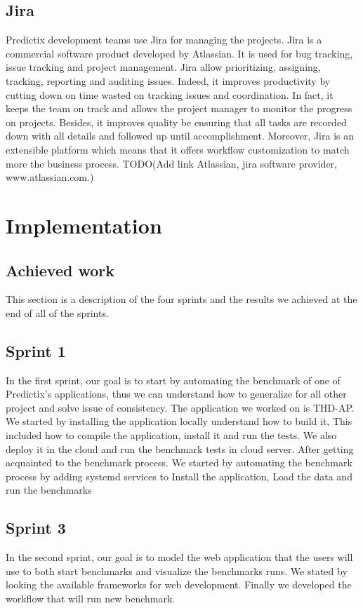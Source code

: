 \subsection{Jira}
Predictix development teams use Jira for managing the projects. Jira is a
commercial software product developed by Atlassian. It is used for bug tracking,
issue tracking and project management. Jira allow prioritizing, assigning,
tracking, reporting and auditing issues. Indeed, it improves productivity by
cutting down on time wasted on tracking issues and coordination. In fact, it
keeps the team on track and allows the project manager to monitor the progress
on projects. Besides, it improves quality be ensuring that all tasks are
recorded down with all details and followed up until accomplishment. Moreover,
Jira is an extensible platform which means that it offers workflow customization
to match more the business process. TODO(Add link Atlassian, jira software
provider, www.atlassian.com.)


\section{Implementation}
\subsection{Achieved work}
This section is a description of the four sprints and the results we achieved at
the end of all of the sprints.
\subsection{Sprint 1}
In the first sprint, our goal is to start by automating the benchmark of one of
Predictix's applications, thus we can understand how to generalize for all other
project and solve issue of consistency. The application we worked on is THD-AP.
We started by installing the application locally understand how to build it,
This included how to compile the application, install it and run the tests.
We also deploy it in the cloud and run the benchmark tests in cloud server.
After getting acquainted to the benchmark process. We started by automating the
benchmark process by adding systemd services to Install the application, Load
the data and run the benchmarks


\subsection{Sprint 3}
In the second sprint, our goal is to model the web application that the users
will use to both start benchmarks and visualize the benchmarks runs. We stated
by looking the available frameworks for web development. Finally we developed
the workflow that will run new benchmark.

